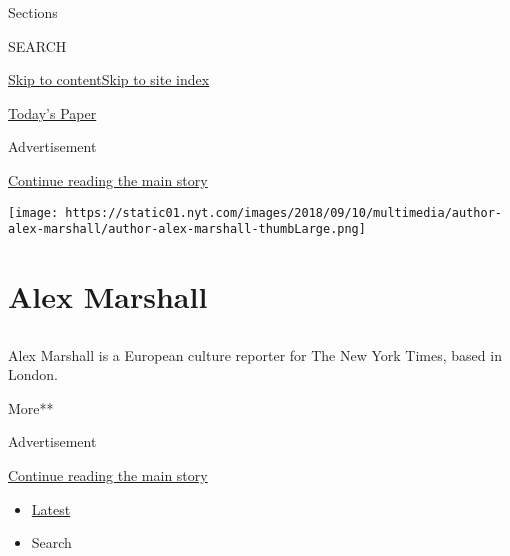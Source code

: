Sections

SEARCH

\protect\hyperlink{site-content}{Skip to
content}\protect\hyperlink{site-index}{Skip to site index}

\href{https://myaccount.nytimes.com/auth/login?response_type=cookie\&client_id=vi}{}

\href{https://www.nytimes.com/section/todayspaper}{Today's Paper}

Advertisement

\protect\hyperlink{after-top}{Continue reading the main story}

\texttt{[image: https://static01.nyt.com/images/2018/09/10/multimedia/author-alex-marshall/author-alex-marshall-thumbLarge.png]}

\hypertarget{alex-marshall}{%
\section{Alex Marshall}\label{alex-marshall}}

\subsection{}

Alex Marshall is a European culture reporter for The New York Times,
based in London.

More**

Advertisement

\protect\hyperlink{after-mid1}{Continue reading the main story}

\begin{itemize}
\tightlist
\item
  \protect\hyperlink{stream-panel}{Latest}
\item
  Search
\end{itemize}

